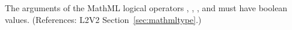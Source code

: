 The arguments of the MathML logical operators ,
, , and  must have boolean values.
(References: L2V2 Section~\ref{sec:mathmltype}.)
